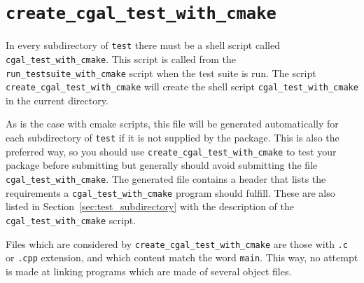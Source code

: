 
\section{{\tt create\_cgal\_test\_with\_cmake}}
\label{sec:create_cgal_test_with_cmake}

In every subdirectory of {\tt test} there must be a shell script called
{\tt cgal\_test\_with\_cmake}. This script is called from the {\tt run\_testsuite\_with\_cmake}%
script when the test suite is run. The script
{{\tt create\_cgal\_test\_with\_cmake}}
will create the shell script {\tt cgal\_test\_with\_cmake} in the current directory.

As is the case with cmake scripts, this file will be generated automatically 
for each subdirectory of {\tt test} if
it is not supplied by the package. This is also the preferred way, so you should
use {\tt create\_cgal\_test\_with\_cmake} to test your package before
submitting but generally should avoid submitting the file {\tt cgal\_test\_with\_cmake}.
The generated file contains a header that lists the requirements a
{\tt cgal\_test\_with\_cmake} program should fulfill. These are also listed in
Section~\ref{sec:test_subdirectory} with the description of the
{\tt cgal\_test\_with\_cmake} script.

Files which are considered by {{\tt create\_cgal\_test\_with\_cmake}} are those with
{\tt .c} or {\tt .cpp} extension, and which content match the word {\tt main}.
This way, no attempt is made at linking programs which are made of several
object files.

